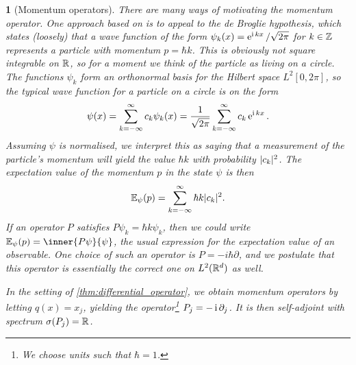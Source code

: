 \documentclass[article, a4paper, 11pt, oneside]{memoir}
\makeatletter
\numberwithin{equation}{chapter}
\theoremstyle{myexample}
\theoremstyle{myexample}
\theoremstyle{myexamplebreak}
\theoremstyle{myexamplebreak}
\newtheorem{examplebreak}[theorem]{\protect\@example}
\theoremstyle{nonumberplain}
\theoremstyle{MyNonumberplain}
\newcommand{\@example}{}
\renewcommand{\@example}{Example}%
\renewcommand{\@example}{Eksempel}%
\makeatother
\begin{document}
\begin{examplebreak}[Momentum operators]
    There are many ways of motivating the momentum operator. One approach based on \textcite[Chapter~3]{hall2013} is to appeal to the \emph{de Broglie hypothesis}, which states (loosely) that a wave function of the form $\psi_k(x) = \operatorname{\mathrm{e}}^{\operatorname{i} kx}/\sqrt{2\pi}$ for $k \in \mathbb{Z}$ represents a particle with momentum $p = \hbar k$. This is obviously not square integrable on $\mathbb{R}$, so for a moment we think of the particle as living on a circle. The functions $\psi_k$ form an orthonormal basis for the Hilbert space $L^2[0,2\pi]$, so the typical wave function for a particle on a circle is on the form
    \begin{equation*}
        \psi(x)
            = \sum_{k=-\infty}^\infty c_k \psi_k(x)
            = \frac{1}{\sqrt{2\pi}} \sum_{k=-\infty}^\infty c_k \operatorname{\mathrm{e}}^{\operatorname{i} kx}.
    \end{equation*}
    Assuming $\psi$ is normalised, we interpret this as saying that a measurement of the particle's momentum will yield the value $\hbar k$ with probability $\lvert c_k\rvert^2$. The expectation value of the momentum $p$ in the state $\psi$ is then
    \begin{equation*}
        \mathbb{E}_\psi(p)
            = \sum_{k=-\infty}^\infty \hbar k \lvert c_k\rvert^2.
    \end{equation*}
    If an operator $P$ satisfies $P \psi_k = \hbar k \psi_k$, then we could write $\mathbb{E}_\psi(p) = \inner{P\psi}{\psi}$, the usual expression for the expectation value of an observable. One choice of such an operator is $P = -i\hbar \partial$, and we postulate that this operator is essentially the correct one on $L^2(\mathbb{R}^d)$ as well.
    
    In the setting of \cref{thm:differential_operator}, we obtain momentum operators by letting $q(x) = x_j$, yielding the operator\footnote{We choose units such that $\hbar = 1$.} $P_j = -\operatorname{i} \partial_j$. It is then self-adjoint with spectrum $\sigma(P_j) = \mathbb{R}$.
\end{examplebreak}
\end{document}

